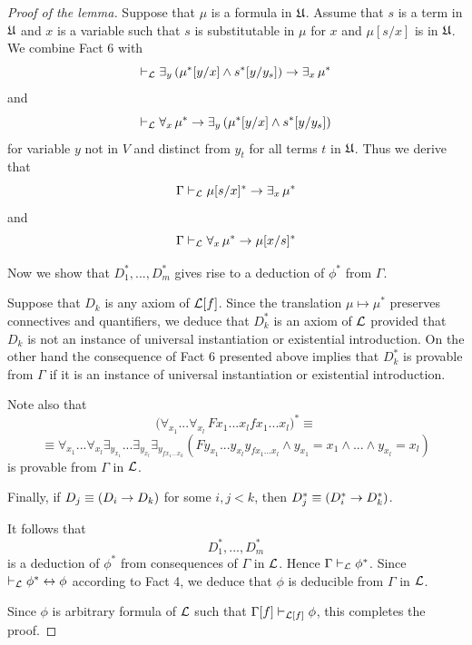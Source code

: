 \documentclass[10pt]{amsart}
\begin{document}
\begin{proof}[Proof of the lemma]
  Suppose that $\mu$ is a formula in ${\mathfrak U}$. Assume that $s$ is a term in ${\mathfrak U}$ and $x$ is a variable such that $s$ is substitutable in $\mu$ for $x$ and $\mu[s/x]$ is in ${\mathfrak U}$. We combine Fact 6 with
  $$\vdash_{{\mathcal L}} \exists_y\left(\mu^*[y/x] \wedge s^*[y/y_s]\right) \rightarrow \exists_x\,\mu^*$$
  and
  $$\vdash_{{\mathcal L}} \forall_x\,\mu^* \rightarrow \exists_y\left(\mu^*[y/x] \wedge s^*[y/y_s]\right)$$
  for variable $y$ not in $V$ and distinct from $y_t$ for all terms $t$ in ${\mathfrak U}$. Thus we derive that
  $$\Gamma \vdash_{{\mathcal L}} \mu[s/x]^* \rightarrow \exists_x\,\mu^*$$
  and
  $$\Gamma \vdash_{{\mathcal L}} \forall_x\,\mu^* \rightarrow \mu[x/s]^*$$
  
  Now we show that $D_1^*,...,D_m^*$ gives rise to a deduction of $\phi^*$ from $\Gamma$.

  Suppose that $D_k$ is any axiom of ${\mathcal L}[f]$. Since the translation $\mu \mapsto \mu^*$ preserves connectives and quantifiers, we deduce that $D_k^*$ is an axiom of ${\mathcal L}$ provided that $D_k$ is not an instance of universal instantiation or existential introduction. On the other hand the consequence of Fact 6 presented above implies that $D_k^*$ is provable from $\Gamma$ if it is an instance of universal instantiation or existential introduction.

  Note also that
  $$\bigg(\forall_{x_1}...\forall_{x_{l}}\,Fx_1...x_lfx_1...x_{l}\bigg)^*  \equiv $$
  $$\equiv \forall_{x_1}...\forall_{x_{l}}\exists_{y_{x_1}}...\exists_{y_{x_l}}\exists_{y_{fx_1...x_k}}\left(Fy_{x_1}...y_{x_l}y_{fx_1...x_{l}} \wedge y_{x_1} = x_1 \wedge ... \wedge y_{x_l} = x_l\right)$$
is provable from $\Gamma$ in ${\mathcal L}$. 

  Finally, if $D_j \equiv (D_i \rightarrow D_k)$ for some $i,j < k$, then $D_j^* \equiv (D_i^* \rightarrow D_k^*)$.

  It follows that
  $$D_1^*,...,D_m^*$$
  is a deduction of $\phi^*$ from consequences of $\Gamma$ in ${\mathcal L}$. Hence $\Gamma \vdash_{{\mathcal L}} \phi^*$. Since $\vdash_{{\mathcal L}} \phi^* \leftrightarrow \phi$ according to Fact 4, we deduce that $\phi$ is deducible from $\Gamma$ in ${\mathcal L}$.

  Since $\phi$ is arbitrary formula of ${\mathcal L}$ such that $\Gamma[f] \vdash_{{\mathcal L}[f]} \phi$, this completes the proof.
\end{proof}
\end{document}
